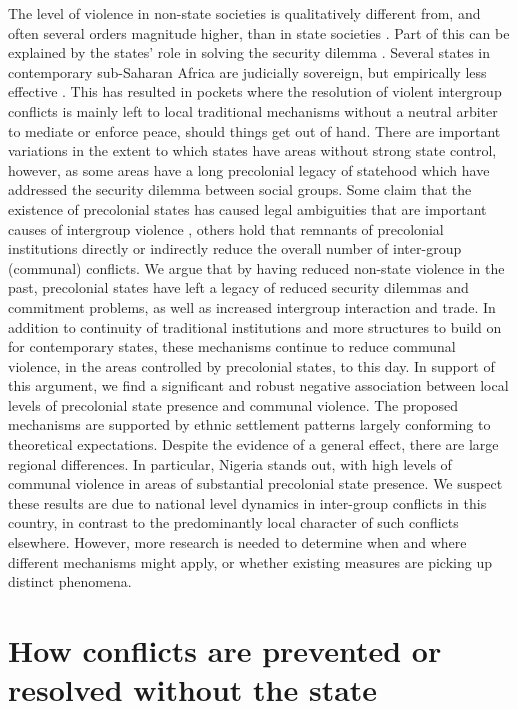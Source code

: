 The level of violence in non-state societies is qualitatively different from,
and often several orders magnitude higher, than in state societies
\citep{diamond2013world, LeBlanc2003, Pinker2012}. Part of this can be explained
by the states’ role in solving the security dilemma \citep{Hobbes, Lake_1996}.
Several states in contemporary sub-Saharan Africa are judicially sovereign, but
empirically less effective \citep{Jackson_1982}. This has resulted in pockets
where the resolution of violent intergroup conflicts is mainly left to local
traditional mechanisms without a neutral arbiter to mediate or enforce peace,
should things get out of hand. There are important variations in the extent to
which states have areas without strong state control, however, as some areas
have a long precolonial legacy of statehood which have addressed the security
dilemma between social groups. Some claim that the existence of precolonial
states has caused legal ambiguities that are important causes of intergroup
violence \citep{Eck2014}, others hold that remnants of precolonial institutions
directly \citep{Herbst2014, Wig2018} or indirectly reduce the overall number of
inter-group (communal) conflicts. We argue that by having reduced non-state
violence in the past, precolonial states have left a legacy of reduced security
dilemmas and commitment problems, as well as increased intergroup interaction
and trade. In addition to continuity of traditional institutions and more
structures to build on for contemporary states, these mechanisms continue to
reduce communal violence, in the areas controlled by precolonial states, to this
day. In support of this argument, we find a significant and robust negative
association between local levels of precolonial state presence and communal
violence. The proposed mechanisms are supported by ethnic settlement patterns
largely conforming to theoretical expectations. Despite the evidence of a
general effect, there are large regional differences. In particular, Nigeria
stands out, with high levels of communal violence in areas of substantial
precolonial state presence. We suspect these results are due to national level
dynamics in inter-group conflicts in this country, in contrast to the
predominantly local character of such conflicts elsewhere. However, more
research is needed to determine when and where different mechanisms might apply,
or whether existing measures are picking up distinct phenomena.

\section{How conflicts are prevented or resolved without the state}
\label{How conflicts are prevented or resolved without the state}

